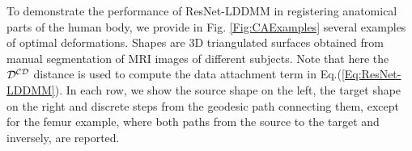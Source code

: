 To demonstrate the performance of ResNet-LDDMM in registering anatomical parts of the human body, we provide in Fig. \ref{Fig:CAExamples} several examples of optimal deformations. Shapes are 3D triangulated surfaces obtained from manual segmentation of MRI images of different subjects. Note that here the $\cal D^{CD}$ distance is used to compute the data attachment term in Eq.(\ref{Eq:ResNet-LDDMM}). In each row, we show the source shape on the left, the target shape on the right and discrete steps from the geodesic path connecting them, except for the femur example, where both paths from the source to the target and inversely, are reported. %




